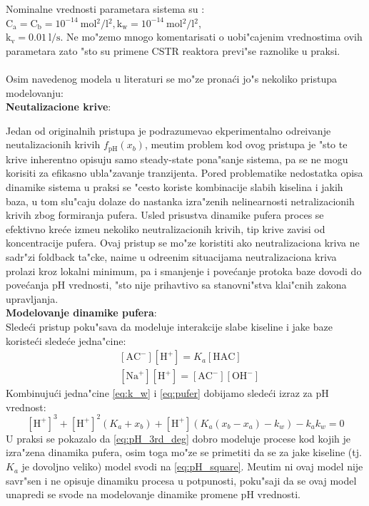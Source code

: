 \documentclass[a4paper,11pt]{article}
\theoremstyle{definition} \newtheorem{deff}{Definicija}[section]
\theoremstyle{definition} \newtheorem{prim}[deff]{Primer}
\theoremstyle{plain} \newtheorem{teor}[deff]{Teorema}
\begin{document}
	Nominalne vrednosti parametara sistema su : $\mathrm{C_{a} = {C_{b}} = 10^{-14} \: mol{^2}/l{^2}, k_{w} = 10^{-14} \: mol{^2}/l{^2}}$, \\ $\mathrm{k_{v} = 0.01 \: l/s  }$. Ne mo"zemo mnogo komentarisati o uobi"cajenim vrednostima ovih parametara zato "sto su primene CSTR reaktora previ"se raznolike u praksi.\\\\
	
	
	\noindent Osim navedenog modela u literaturi se mo"ze prona\'ci jo"s nekoliko pristupa modelovanju:\\
	
	\textbf{Neutalizacione krive}:
	
	\noindent Jedan od originalnih pristupa je podrazumevao ekperimentalno odre\dj{}ivanje neutalizacionih krivih $f_{\text{pH}}(x_b)$, me\dj{}utim problem kod ovog pristupa je "sto te krive inherentno opisuju samo steady-state pona"sanje sistema, pa se ne mogu korisiti za efikasno ubla"zavanje tranzijenta. Pored problematike nedostatka opisa dinamike sistema u praksi se "cesto koriste kombinacije slabih kiselina i jakih baza, u tom slu"caju dolaze do nastanka izra"zenih nelinearnosti netralizacionih krivih zbog formiranja pufera. Usled prisustva dinamike pufera proces se efektivno kre\'ce izme\dj{}u nekoliko neutralizacionih krivih, tip krive zavisi od koncentracije pufera. Ovaj pristup se mo"ze koristiti ako neutralizaciona kriva ne sadr"zi foldback ta"cke, naime u odre\dj{}enim situacijama neutralizaciona kriva prolazi kroz lokalni minimum, pa i smanjenje i pove\'canje protoka baze dovodi do pove\'canja pH vrednosti, "sto nije prihavtivo sa stanovni"stva klai"cnih zakona upravljanja.\\
	\clearpage
	\textbf{Modelovanje dinamike pufera}:\\
	\noindent Slede\'ci pristup poku"sava da modeluje interakcije slabe kiseline i jake baze koriste\'ci slede\'ce jedna"cine: 
	\begin{align}\label{eq:pufer}
		&[\text{AC}^-][\text{H}^+] = K_a [\text{HAC}]\\
		&[\text{Na}^+][\text{H}^+] = [\text{AC}^-][\text{OH}^-]
	\end{align}
	Kombinuju\'ci jedna"cine \eqref{eq:k_w} i \eqref{eq:pufer} dobijamo slede\'ci izraz za pH vrednost:
	\begin{equation}\label{eq:pH_3rd_deg}
		[\text{H}^+]^3 + [\text{H}^+]^2(K_a + x_b) + [\text{H}^+](K_a(x_b - x_a) -k_w) - k_ak_w = 0
	\end{equation}
	U praksi se pokazalo da \eqref{eq:pH_3rd_deg} dobro modeluje procese kod kojih je izra"zena dinamika pufera, osim toga mo"ze se primetiti da se za jake kiseline (tj. $K_a$ je dovoljno veliko) model svodi na \eqref{eq:pH_square}. Me\dj{}utim ni ovaj model nije savr"sen i ne opisuje dinamiku procesa u potpunosti, poku"saji da se ovaj model unapredi se svode na modelovanje dinamike promene pH vrednosti.\\
	
\end{document}
